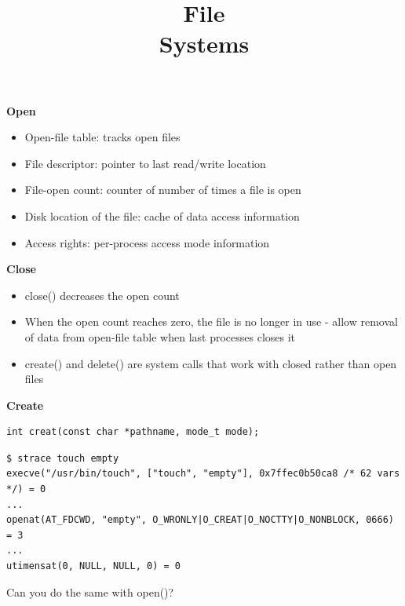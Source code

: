 

\title{File\\Systems}



\begin{frame}
    \titlepage
\end{frame}

\begin{slide}

    \textbf{Open}
    \begin{itemize}
        \item Open-file table: tracks open files
        \item File descriptor: pointer to last read/write location
        \item File-open count: counter of number of times a file is open
        \item Disk location of the file: cache of data access information
        \item Access rights: per-process access mode information
    \end{itemize}
    \medskip

    \textbf{Close}
    \begin{itemize}
        \item close() decreases the open count
        \item When the open count reaches zero, the file is no longer in use - allow removal of data from open-file table when last processes closes it
        \item create() and delete() are system calls that work with closed rather than open files
    \end{itemize}

\end{slide}

\begin{slide}


    \textbf{Create}
    
    \begin{verbatim}
int creat(const char *pathname, mode_t mode);
    \end{verbatim}
    \bigskip

	\begin{verbatim}
$ strace touch empty
execve("/usr/bin/touch", ["touch", "empty"], 0x7ffec0b50ca8 /* 62 vars */) = 0
...
openat(AT_FDCWD, "empty", O_WRONLY|O_CREAT|O_NOCTTY|O_NONBLOCK, 0666) = 3
...
utimensat(0, NULL, NULL, 0) = 0
	\end{verbatim}

    \bigskip
    Can you do the same with open()?
\end{slide}

